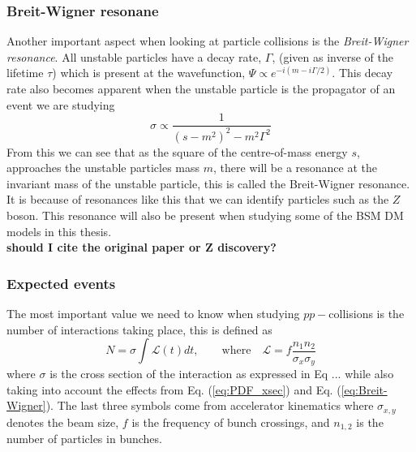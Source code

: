 \documentclass[14pt, a4paper]{book}
\begin{document}
\clearpage
\subsubsection{Breit-Wigner resonane}
Another important aspect when looking at particle collisions is the \textit{Breit-Wigner resonance}. All unstable particles have a decay rate, $\Gamma$, (given as inverse of the lifetime $\tau$) which is present at the wavefunction, 
$\Psi \propto e^{-i(m-i\Gamma/2)}$. This decay rate also becomes apparent when the unstable particle is the propagator of an event we are studying 
\begin{equation}\label{eq:Breit-Wigner}
    \sigma \propto\frac{1}{(s-m^2)^2-m^2\Gamma^2}
\end{equation}
From this we can see that as the square of the centre-of-mass energy $s$, approaches the unstable particles mass $m$, there will be a resonance at the invariant mass of the unstable particle, this is called the Breit-Wigner resonance. 
It is because of resonances like this that we can identify particles such as the $Z$ boson. This resonance will also be present when studying some of the BSM DM models in this thesis.\\
\textbf{should I cite the original paper or Z discovery?}


\subsubsection{Expected events}
The most important value we need to know when studying $pp-$collisions is the number of interactions taking place, this is defined as
\begin{equation}\label{eq:expected_events}
    N=\sigma\int\mathcal{L}(t)dt, \qquad\text{where}\quad \mathcal{L}=f\frac{n_1n_2}{\sigma_x\sigma_y}
\end{equation}
where $\sigma$ is the cross section of the interaction as expressed in Eq ...  while also taking into account the effects from Eq. (\ref{eq:PDF_xsec}) and Eq. (\ref{eq:Breit-Wigner}).
The last three symbols come from accelerator kinematics where $\sigma_{x,y}$ denotes the beam size, $f$ is the frequency of bunch crossings, and $n_{1,2}$ is the number of particles in bunches.





\clearpage
\end{document}

